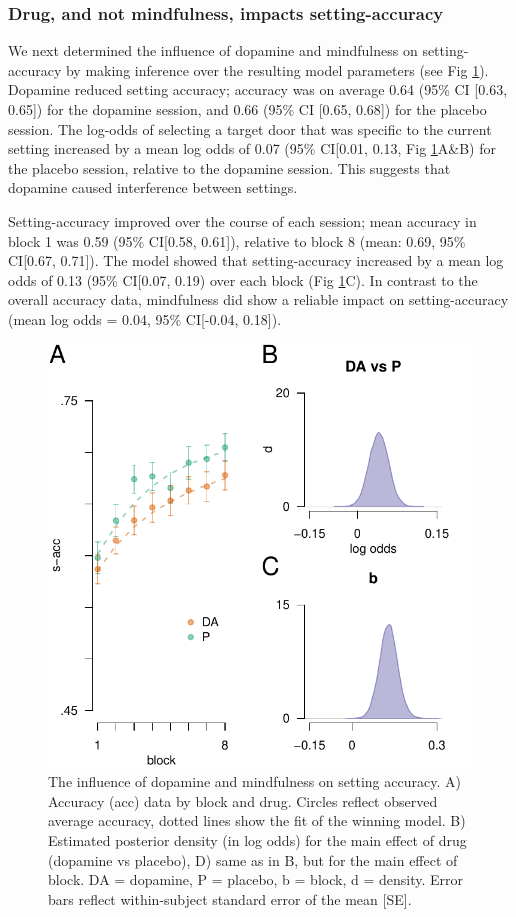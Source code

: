 \documentclass{article}
\begin{document}
\hypertarget{drug-and-not-mindfulness-impacts-setting-accuracy}{%
\subsubsection{Drug, and not mindfulness, impacts
setting-accuracy}\label{drug-and-not-mindfulness-impacts-setting-accuracy}}

We next determined the influence of dopamine and mindfulness on
setting-accuracy by making inference over the resulting model parameters
(see Fig \ref{fig:caccfig}). Dopamine reduced setting accuracy; accuracy
was on average 0.64 (95\% CI {[}0.63, 0.65{]}) for the dopamine session,
and 0.66 (95\% CI {[}0.65, 0.68{]}) for the placebo session. The
log-odds of selecting a target door that was specific to the current
setting increased by a mean log odds of 0.07 (95\% CI{[}0.01, 0.13, Fig
\ref{fig:caccfig}A\&B) for the placebo session, relative to the dopamine
session. This suggests that dopamine caused interference between
settings.

Setting-accuracy improved over the course of each session; mean accuracy
in block 1 was 0.59 (95\% CI{[}0.58, 0.61{]}), relative to block 8
(mean: 0.69, 95\% CI{[}0.67, 0.71{]}). The model showed that
setting-accuracy increased by a mean log odds of 0.13 (95\% CI{[}0.07,
0.19) over each block (Fig \ref{fig:caccfig}C). In contrast to the
overall accuracy data, mindfulness did show a reliable impact on
setting-accuracy (mean log odds = 0.04, 95\% CI{[}-0.04, 0.18{]}).

\begin{figure}

{\centering \includegraphics[width=0.7\linewidth]{../../images/cacc_fig} 

}

\caption{The influence of dopamine and mindfulness on setting accuracy. A) Accuracy (acc) data by block and drug. Circles reflect observed average accuracy, dotted lines show the fit of the winning model. B) Estimated posterior density (in log odds) for the main effect of drug (dopamine vs placebo), D) same as in B, but for the main effect of block. DA = dopamine, P = placebo, b = block, d = density. Error bars reflect within-subject standard error of the mean [SE].}\label{fig:caccfig}
\end{figure}
\end{document}
